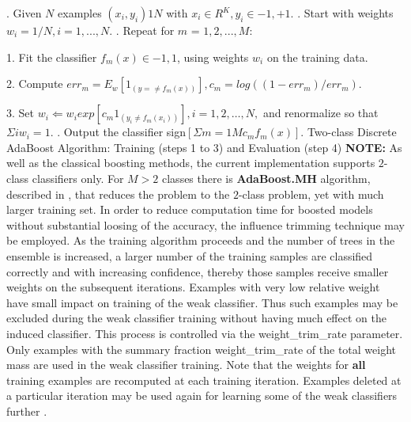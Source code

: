 \newline
{}. Given $N$ examples ${(x_i,y_i)}1N$ with $x_i \in{R^K}, y_i \in{-1, +1}$.
. Start with weights $w_i = 1/N, i = 1,...,N$.
. Repeat for $m$ = $1,2,...,M$:
\newline
    \par 1. Fit the classifier $f_m(x) \in{-1,1}$, using weights $w_i$ on the training data.
\newline
    \par 2. Compute $err_m = E_w [1_{(y =\neq f_m(x))}], c_m = log((1 - err_m)/err_m)$.
\newline
    \par 3. Set $w_i \Leftarrow w_i exp[c_m 1_{(y_i \neq f_m(x_i))}], i = 1,2,…,N,$ and renormalize so that $\Sigma i w_i = 1$.
. Output the classifier sign$[\Sigma m = 1M c_m f_m(x)]$.
\newline
\newline
  Two-class Discrete AdaBoost Algorithm: Training (steps 1 to 3) and Evaluation (step 4)
\newline
\newline
\textbf{NOTE:} As well as the classical boosting methods, the current implementation supports $2$-class classifiers only. For $M>2$ classes there is \textbf{AdaBoost.MH} algorithm, described in , that reduces the problem to the $2$-class problem, yet with much larger training set.
\newline
\newline
In order to reduce computation time for boosted models without substantial loosing of the accuracy, the influence trimming technique may be employed. As the training algorithm proceeds and the number of trees in the ensemble is increased, a larger number of the training samples are classified correctly and with increasing confidence, thereby those samples receive smaller weights on the subsequent iterations. Examples with very low relative weight have small impact on training of the weak classifier. Thus such examples may be excluded during the weak classifier training without having much effect on the induced classifier. This process is controlled via the weight\_trim\_rate parameter. Only examples with the summary fraction weight\_trim\_rate of the total weight mass are used in the weak classifier training. Note that the weights for \textbf{all} training examples are recomputed at each training iteration. Examples deleted at a particular iteration may be used again for learning some of the weak classifiers further .
\newline
\newline

